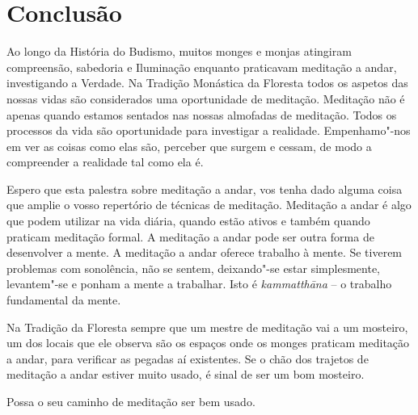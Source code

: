 \chapter{Conclusão}

Ao longo da História do Budismo, muitos monges e monjas atingiram
compreensão, sabedoria e Iluminação enquanto praticavam meditação a
andar, investigando a Verdade. Na Tradição Monástica da Floresta todos
os aspetos das nossas vidas são considerados uma oportunidade de
meditação. Meditação não é apenas quando estamos sentados nas nossas
almofadas de meditação. Todos os processos da vida são oportunidade para
investigar a realidade. Empenhamo"-nos em ver as coisas como elas são,
perceber que surgem e cessam, de modo a compreender a realidade tal como
ela é.

Espero que esta palestra sobre meditação a andar, vos tenha dado alguma
coisa que amplie o vosso repertório de técnicas de meditação. Meditação
a andar é algo que podem utilizar na vida diária, quando estão ativos e
também quando praticam meditação formal. A meditação a andar pode ser
outra forma de desenvolver a mente. A meditação a andar oferece trabalho
à mente. Se tiverem problemas com sonolência, não se sentem, deixando"-se
estar simplesmente, levantem"-se e ponham a mente a trabalhar. Isto é
\emph{kammatthāna} -- o trabalho fundamental da mente.

Na Tradição da Floresta sempre que um mestre de meditação vai a um
mosteiro, um dos locais que ele observa são os espaços onde os monges
praticam meditação a andar, para verificar as pegadas aí existentes. Se
o chão dos trajetos de meditação a andar estiver muito usado, é sinal de
ser um bom mosteiro.


Possa o seu caminho de meditação ser bem usado.

